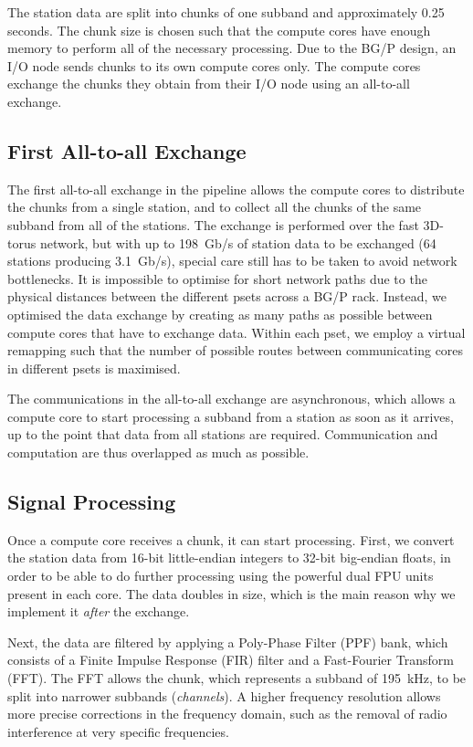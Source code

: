 \documentclass{llncs}
\begin{document}
The station data are split into chunks of one subband and approximately 0.25 seconds. The chunk size is chosen such that the compute cores have enough memory to perform all of the necessary processing. Due to the BG/P design, an I/O node sends chunks to its own compute cores only. The compute cores exchange the chunks they obtain from their I/O node using an all-to-all exchange. 

\subsection{First All-to-all Exchange}

The first all-to-all exchange in the pipeline allows the compute cores to distribute the chunks from a single station, and to collect all the chunks of the same subband from all of the stations. The exchange is performed over the fast 3D-torus network, but with up to 198~Gb/s of station data to be exchanged (64 stations producing 3.1~Gb/s), special care still has to be taken to avoid network bottlenecks. It is impossible to optimise for short network paths due to the physical distances between the different psets across a BG/P rack. Instead, we optimised the data exchange by creating as many paths as possible between compute cores that have to exchange data. Within each pset, we employ a virtual remapping such that the number of possible routes between communicating cores in different psets is maximised.

The communications in the all-to-all exchange are asynchronous, which allows a compute core to start processing a subband from a station as soon as it arrives, up to the point that data from all stations are required. Communication and computation are thus overlapped as much as possible.

\subsection{Signal Processing}

Once a compute core receives a chunk, it can start processing. First, we convert the station data from 16-bit little-endian integers to 32-bit big-endian floats, in order to be able to do further processing using the powerful dual FPU units present in each core. The data doubles in size, which is the main reason why we implement it \emph{after} the exchange.

Next, the data are filtered by applying a Poly-Phase Filter (PPF) bank, which consists of a Finite Impulse Response (FIR) filter and a Fast-Fourier Transform (FFT). The FFT allows the chunk, which represents a subband of 195~kHz, to be split into narrower subbands (\emph{channels}). A higher frequency resolution allows more precise corrections in the frequency domain, such as the removal of radio interference at very specific frequencies.
\end{document}
